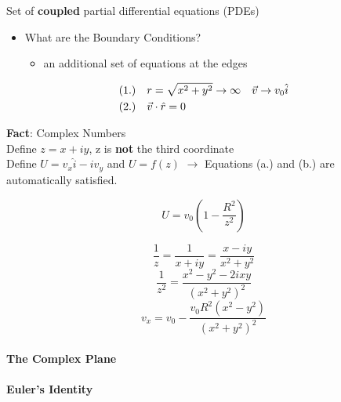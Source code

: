 \documentclass[svgnames]{article}   	%
\begin{document}
\begin{tcolorbox}[colback = red!5!white, colframe = red!50!black, title
  = Solving (a) and (b) ]
  
  Set of \textbf{coupled} partial differential equations (PDEs) 

  \begin{itemize}
    \item What are the Boundary Conditions? 
    \begin{itemize}
      \item an additional set of equations at the edges
    \end{itemize}
  \end{itemize}

  \begin{align*}
    &(1.) \hspace{10px} r = \sqrt{x^2 + y^2} \rightarrow \infty \hspace{10px}
    \vec{v} \rightarrow v_0 \hat{i} \\
    &(2.) \hspace{10px} \vec{v} \cdot \hat{r} = 0
  \end{align*}
  
 \textbf{Fact}: Complex Numbers \\
 Define $z = x + iy$, z is \textbf{not} the third coordinate\\
 Define $U = v_x \hat{i} - iv_y$ and $U = f(z)$ $\rightarrow$ Equations (a.)
 and
 (b.) are automatically satisfied. 

\end{tcolorbox}

\begin{tcolorbox}[colback = blue!5!white, colframe = blue!50!black, title
  = Solution]
  \[
  U = v_0\left(1-\frac{R^2}{z^2}\right)
  \]

  \[
  \frac{1}{z} = \frac{1}{x+iy} = \frac{x-iy}{x^2 + y^2}
  \]
  \[
  \frac{1}{z^2} = \frac{x^2 - y^2 - 2ixy}{(x^2 + y^2)^2}
  \]
  \[
  v_x = v_0 - \frac{v_0R^2(x^2 - y^2)}{(x^2 + y^2)^2}
  \]
  
\end{tcolorbox}

\paragraph{The Complex Plane}


\paragraph{Euler's Identity}
\end{document}
